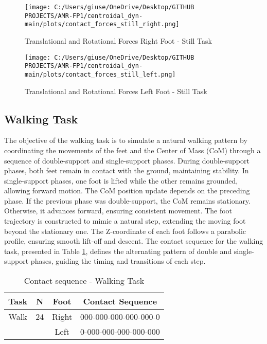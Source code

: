 \documentclass[main.tex]{subfiles}
\begin{document}
\begin{sloppypar}
\vspace*{2.5cm}
\begin{figure}[htbp]
    \centering
    \texttt{[image: C:/Users/giuse/OneDrive/Desktop/GITHUB PROJECTS/AMR-FP1/centroidal\_dyn-main/plots/contact\_forces\_still\_right.png]}
    \caption{Translational and Rotational Forces Right Foot - Still Task}
    \label{fig:contact_forces_still_right}
\end{figure}
\begin{figure}[htbp]
    \centering
    \texttt{[image: C:/Users/giuse/OneDrive/Desktop/GITHUB PROJECTS/AMR-FP1/centroidal\_dyn-main/plots/contact\_forces\_still\_left.png]}
    \caption{Translational and Rotational Forces Left Foot - Still Task}
    \label{fig:contact_forces_still_left}
\end{figure}
\newpage
\subsection{Walking Task}
The objective of the walking task is to simulate a natural walking pattern by coordinating the movements of the feet and the Center of Mass (CoM) through a sequence of double-support and single-support phases. During double-support phases, both feet remain in contact with the ground, maintaining stability. In single-support phases, one foot is lifted while the other remains grounded, allowing forward motion.
The CoM position update depends on the preceding phase. If the previous phase was double-support, the CoM remains stationary. Otherwise, it advances forward, ensuring consistent movement. The foot trajectory is constructed to mimic a natural step, extending the moving foot beyond the stationary one. The Z-coordinate of each foot follows a parabolic profile, ensuring smooth lift-off and descent.
The contact sequence for the walking task, presented in Table \ref{tab:walkingtask}, defines the alternating pattern of double and single-support phases, guiding the timing and transitions of each step.
\begin{table}[H]
    \centering
    \begin{tabular}{|c|c|c|c|}
        \hline
        Task & N & Foot & Contact Sequence \\
        \hline
        Walk & 24 & Right & 000-000-000-000-000-0 \\
             &    & Left  & 0-000-000-000-000-000 \\
        \hline
    \end{tabular}
    \caption{Contact sequence - Walking Task}
    \label{tab:walkingtask}
\end{table}

\end{sloppypar}
\end{document}
